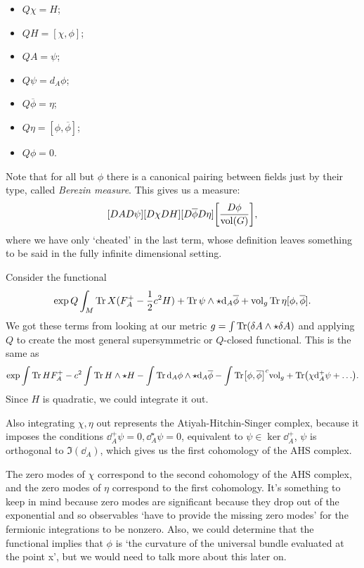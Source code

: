 \documentclass[leqno, openany]{memoir}
\theoremstyle{definition}
\theoremstyle{remark}
\theoremstyle{plain}
\theoremstyle{definition}
\theoremstyle{remark}
\newcommand{\mr}[1]{\mathrm{#1}}
\begin{document}
\begin{itemize}
  \item $Q\chi = H$;
  \item $QH = [\chi, \phi]$;
  \item $QA = \psi$;
  \item $Q\psi = d_{A} \phi$;
  \item $Q\overline{\phi} = \eta$;
  \item $Q\eta = [\phi,\overline{\phi}]$;
        \item $Q\phi = 0$.
\end{itemize}
Note that for all but $\phi$ there is a canonical pairing between fields just by their type, called \emph{Berezin measure}. This gives us a measure:
\[
[DA D\psi][D\chi DH] [D\overline{\phi} D\eta] \qty[\frac{D\phi}{\mr{vol}(G)}],
\]
where we have only `cheated' in the last term, whose definition leaves something to be said in the fully infinite dimensional setting.

Consider the functional
\[
\exp Q \int_{M} \Tr X(F_{A}^{+} - \frac{1}{2} c^{2} H) + \Tr \psi \wedge \star \dd_{A} \overline{\phi} + \mr{vol}_{g}\Tr \eta[\phi,\overline{\phi}].
\]
We got these terms from looking at our metric $g= \int \Tr(\delta A \wedge \star \delta A)$ and applying $Q$ to create the most general supersymmetric or $Q$-closed functional.
This is the same as
\[
\exp  \int \Tr H F_{A}^{+} - c^{2} \int \Tr H\wedge \star H- \int \Tr \dd_{A} \phi \wedge \star \dd_{A} \overline{\phi} - \int \Tr[\phi, \overline{\phi}]^{c} \mr{vol}_{g} + \Tr(\chi \dd_{A}^{+} \psi + \dots).
\]
Since $H$ is quadratic, we could integrate it out.

Also integrating $\chi,\eta$ out represents the Atiyah-Hitchin-Singer complex, because it imposes the conditions $\dd_{A}^{+}\psi = 0, \dd_{A}^{\star} \psi = 0$, equivalent to $\psi \in \ker \dd_{A}^{+}$, $\psi$ is orthogonal to $\Im(\dd_{A})$, which gives us the first cohomology of the AHS complex.

The zero modes of $\chi$ correspond to the second cohomology of the AHS complex, and the zero modes of $\eta$ correspond to the first cohomology. It's something to keep in mind because zero modes are significant because they drop out of the exponential and so observables `have to provide the missing zero modes' for the fermionic integrations to be nonzero.
Also, we could determine that the functional implies that $\phi$ is `the curvature of the universal bundle evaluated at the point x', but we would need to talk more about this later on.
\end{document}

